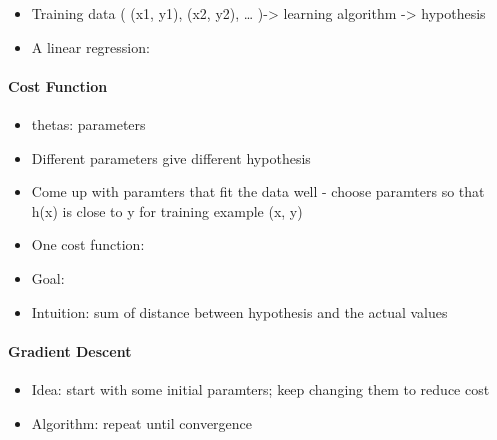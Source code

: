 \documentclass[]{article}
\providecommand{\tightlist}{%
  \setlength{\itemsep}{0pt}\setlength{\parskip}{0pt}}
\let\oldparagraph\paragraph
\renewcommand{\paragraph}[1]{\oldparagraph{#1}\mbox{}}
\begin{document}
\begin{itemize}
\tightlist
\item
  Training data ( (x1, y1), (x2, y2), \ldots{} )-\textgreater{} learning
  algorithm -\textgreater{} hypothesis
\item
  A linear regression:
\end{itemize}

\hypertarget{cost-function}{%
\paragraph{Cost Function}\label{cost-function}}

\begin{itemize}
\tightlist
\item
  thetas: parameters
\item
  Different parameters give different hypothesis
\item
  Come up with paramters that fit the data well - choose paramters so
  that h(x) is close to y for training example (x, y)
\item
  One cost function:
\end{itemize}

\begin{itemize}
\tightlist
\item
  Goal:
\end{itemize}

\begin{itemize}
\tightlist
\item
  Intuition: sum of distance between hypothesis and the actual values
\end{itemize}

\hypertarget{gradient-descent}{%
\paragraph{Gradient Descent}\label{gradient-descent}}

\begin{itemize}
\tightlist
\item
  Idea: start with some initial paramters; keep changing them to reduce
  cost
\item
  Algorithm: repeat until convergence
\end{itemize}
\end{document}
